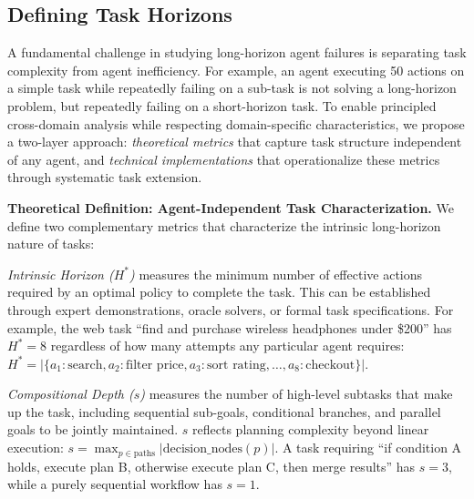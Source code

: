 \documentclass[11pt]{article}
\begin{document}
\subsection{Defining Task Horizons} \label{subsec:horizon_definition}
A fundamental challenge in studying long-horizon agent failures is separating task complexity from agent inefficiency. 
For example, an agent executing 50 actions on a simple task while repeatedly failing on a sub-task is not solving a long-horizon problem, but repeatedly failing on a short-horizon task.
To enable principled cross-domain analysis while respecting domain-specific characteristics, we propose a two-layer approach: \textit{theoretical metrics} that capture task structure independent of any agent, and \textit{technical implementations} that operationalize these metrics through systematic task extension.

\textbf{Theoretical Definition: Agent-Independent Task Characterization.}
We define two complementary metrics that characterize the intrinsic long-horizon nature of tasks:

\textit{Intrinsic Horizon ($H^*$)} measures the minimum number of effective actions required by an optimal policy to complete the task. This can be established through expert demonstrations, oracle solvers, or formal task specifications. For example, the web task ``find and purchase wireless headphones under \$200'' has $H^* = 8$ regardless of how many attempts any particular agent requires:
$H^* = |\{a_1: \text{search}, a_2: \text{filter price}, a_3: \text{sort rating},
 \ldots, a_8:
\text{checkout}\}|$.

\textit{Compositional Depth ($s$)} measures the number of high-level subtasks that make up the task, including sequential sub-goals, conditional branches, and parallel goals to be jointly maintained. $s$ reflects planning complexity beyond linear execution:
$s = \max_{p \in \text{paths}} |\text{decision\_nodes}(p)|$.
A task requiring ``if condition A holds, execute plan B, otherwise execute plan C, then merge results'' has $s=3$, while a purely sequential workflow has $s=1$.
\end{document}
